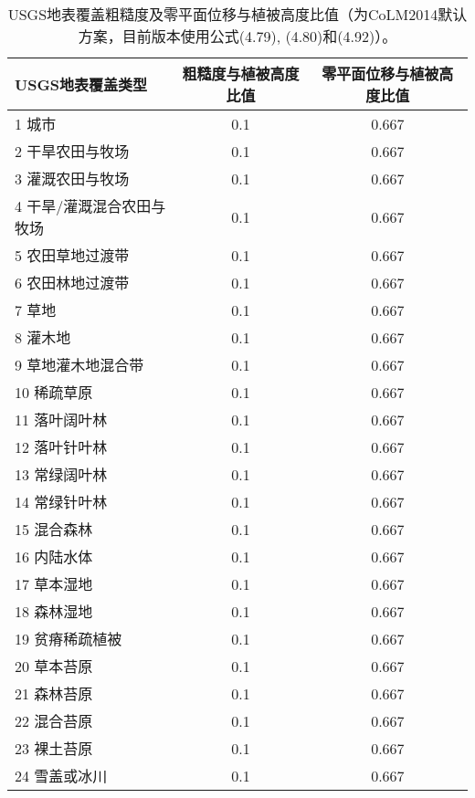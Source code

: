 \begin{table}[]
\centering
\caption{USGS地表覆盖粗糙度及零平面位移与植被高度比值（为CoLM2014默认方案，目前版本使用公式(4.79), (4.80)和(4.92)）。}
\label{tab:USGS地表覆盖粗糙度及零平面位移与植被高度比值}
\begin{tabular}{@{}lcc@{}}
\toprule
USGS地表覆盖类型     & 粗糙度与植被高度比值 & 零平面位移与植被高度比值 \\ \midrule
1 城市           & 0.1        & 0.667        \\
2 干旱农田与牧场      & 0.1        & 0.667        \\
3 灌溉农田与牧场      & 0.1        & 0.667        \\
4 干旱/灌溉混合农田与牧场 & 0.1        & 0.667        \\
5 农田草地过渡带      & 0.1        & 0.667        \\
6 农田林地过渡带      & 0.1        & 0.667        \\
7 草地           & 0.1        & 0.667        \\
8 灌木地          & 0.1        & 0.667        \\
9 草地灌木地混合带     & 0.1        & 0.667        \\
10 稀疏草原        & 0.1        & 0.667        \\
11 落叶阔叶林       & 0.1        & 0.667        \\
12 落叶针叶林       & 0.1        & 0.667        \\
13 常绿阔叶林       & 0.1        & 0.667        \\
14 常绿针叶林       & 0.1        & 0.667        \\
15 混合森林        & 0.1        & 0.667        \\
16 内陆水体        & 0.1        & 0.667        \\
17 草本湿地        & 0.1        & 0.667        \\
18 森林湿地        & 0.1        & 0.667        \\
19 贫瘠稀疏植被      & 0.1        & 0.667        \\
20 草本苔原        & 0.1        & 0.667        \\
21 森林苔原        & 0.1        & 0.667        \\
22 混合苔原        & 0.1        & 0.667        \\
23 裸土苔原        & 0.1        & 0.667        \\
24 雪盖或冰川       & 0.1        & 0.667        \\ \bottomrule
\end{tabular}
\end{table}


